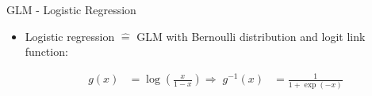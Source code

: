 \documentclass[11pt,compress,t,notes=noshow, aspectratio=169, xcolor=table]{beamer}
\begin{document}
\begin{frame}{GLM - Logistic Regression}

\begin{itemize}
    \item Logistic regression $\hat{=}$ GLM with Bernoulli distribution and logit link function: 

\begin{align*}
    g(x) &= \log\left(\frac{x}{1 - x}\right)  
    \Rightarrow \; g^{-1}(x) &= \frac{1}{1+\exp(-x)}
\end{align*}




\end{itemize}
\end{frame}
\end{document}
